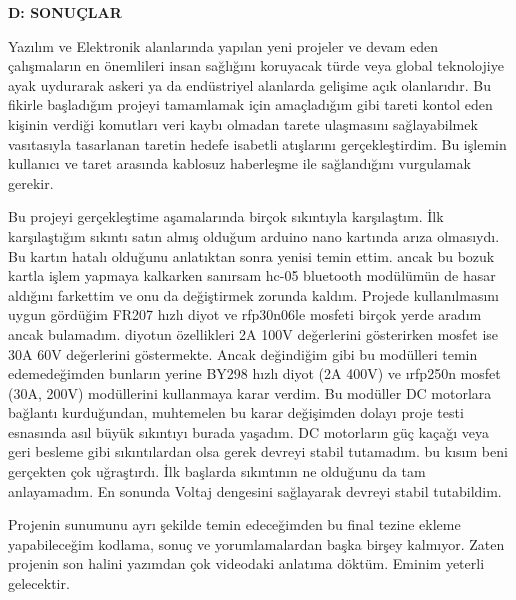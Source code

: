 \textbf{D: SONUÇLAR }
\label{BolumSonuc}

	Yazılım ve Elektronik alanlarında yapılan yeni projeler ve devam eden çalışmaların en önemlileri insan sağlığını koruyacak türde veya global teknolojiye ayak uydurarak askeri ya da endüstriyel alanlarda gelişime açık olanlarıdır. Bu fikirle başladığım projeyi tamamlamak için amaçladığım gibi tareti kontol eden kişinin verdiği komutları veri kaybı olmadan tarete ulaşmasını sağlayabilmek vasıtasıyla tasarlanan taretin hedefe isabetli atışlarını gerçekleştirdim. Bu işlemin kullanıcı ve taret arasında kablosuz haberleşme ile sağlandığını vurgulamak gerekir.
    
Bu projeyi gerçekleştime aşamalarında birçok sıkıntıyla karşılaştım. İlk karşılaştığım sıkıntı satın almış olduğum arduino nano kartında arıza olmasıydı. Bu kartın hatalı olduğunu anlatıktan sonra yenisi temin ettim. ancak bu bozuk kartla işlem yapmaya kalkarken sanırsam hc-05 bluetooth modülümün de hasar aldığını farkettim ve onu da değiştirmek zorunda kaldım. Projede kullanılmasını uygun gördüğim FR207 hızlı diyot ve rfp30n06le mosfeti birçok yerde aradım ancak bulamadım. diyotun özellikleri 2A 100V değerlerini gösterirken mosfet ise 30A 60V değerlerini göstermekte. Ancak değindiğim gibi bu modülleri temin edemedeğimden bunların yerine BY298 hızlı diyot (2A 400V) ve ırfp250n mosfet (30A, 200V) modüllerini kullanmaya karar verdim. Bu modüller DC motorlara bağlantı kurduğundan, muhtemelen bu karar değişimden dolayı proje testi esnasında asıl büyük sıkıntıyı burada yaşadım. DC motorların güç kaçağı veya geri besleme gibi sıkıntılardan olsa gerek devreyi stabil tutamadım. bu kısım beni gerçekten çok uğraştırdı. İlk başlarda sıkıntının ne olduğunu da tam anlayamadım. En sonunda Voltaj dengesini sağlayarak devreyi stabil tutabildim.

Projenin sunumunu ayrı şekilde temin edeceğimden bu final tezine ekleme yapabileceğim kodlama, sonuç ve yorumlamalardan başka birşey kalmıyor. Zaten projenin son halini yazımdan çok videodaki anlatıma döktüm. Eminim yeterli gelecektir.

\clearpage